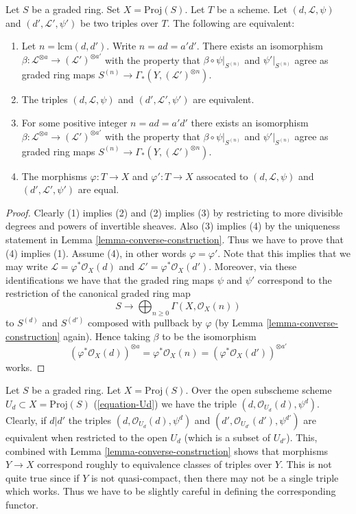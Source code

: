 \begin{lemma}
\label{lemma-equivalent}
Let $S$ be a graded ring. Set $X = \text{Proj}(S)$. Let $T$ be a scheme.
Let $(d, \mathcal{L}, \psi)$ and $(d', \mathcal{L}', \psi')$
be two triples over $T$. The following are equivalent:
\begin{enumerate}
\item Let $n = \text{lcm}(d, d')$. Write $n = ad = a'd'$. There exists
an isomorphism
$\beta : \mathcal{L}^{\otimes a} \to (\mathcal{L}')^{\otimes a'}$
with the property that
$\beta \circ \psi|_{S^{(n)}}$ and $\psi'|_{S^{(n)}}$ agree
as graded ring maps $S^{(n)} \to \Gamma_*(Y, (\mathcal{L}')^{\otimes n})$.
\item The triples $(d, \mathcal{L}, \psi)$ and $(d', \mathcal{L}', \psi')$
are equivalent.
\item For some positive integer $n = ad = a'd'$ there exists
an isomorphism
$\beta : \mathcal{L}^{\otimes a} \to (\mathcal{L}')^{\otimes a'}$
with the property that
$\beta \circ \psi|_{S^{(n)}}$ and $\psi'|_{S^{(n)}}$ agree
as graded ring maps $S^{(n)} \to \Gamma_*(Y, (\mathcal{L}')^{\otimes n})$.
\item The morphisms $\varphi : T \to X$ and $\varphi' : T \to X$
assocated to $(d, \mathcal{L}, \psi)$ and $(d', \mathcal{L}', \psi')$
are equal.
\end{enumerate}
\end{lemma}

\begin{proof}
Clearly (1) implies (2) and (2) implies (3) by restricting to
more divisible degrees and powers of invertible sheaves.
Also (3) implies (4) by the uniqueness statement
in Lemma \ref{lemma-converse-construction}.
Thus we have to prove that (4) implies (1). Assume (4),
in other words $\varphi = \varphi'$.
Note that this implies that we may write
$\mathcal{L} = \varphi^*\mathcal{O}_X(d)$ and
$\mathcal{L}' = \varphi^*\mathcal{O}_X(d')$.
Moreover, via these identifications we have that the graded ring
maps $\psi$ and $\psi'$ correspond to the restriction of the canonical
graded ring map
$$
S \longrightarrow \bigoplus\nolimits_{n \geq 0} \Gamma(X, \mathcal{O}_X(n))
$$
to $S^{(d)}$ and $S^{(d')}$ composed with pullback by $\varphi$
(by Lemma \ref{lemma-converse-construction} again). Hence taking
$\beta$ to be the isomorphism
$$
(\varphi^*\mathcal{O}_X(d))^{\otimes a} =
\varphi^*\mathcal{O}_X(n) =
(\varphi^*\mathcal{O}_X(d'))^{\otimes a'}
$$
works.
\end{proof}

\noindent
Let $S$ be a graded ring.
Let $X = \text{Proj}(S)$.
Over the open subscheme scheme $U_d \subset X = \text{Proj}(S)$
(\ref{equation-Ud}) we have the triple
$(d, \mathcal{O}_{U_d}(d), \psi^d)$. Clearly, if $d | d'$ the triples
$(d, \mathcal{O}_{U_d}(d), \psi^d)$ and
$(d', \mathcal{O}_{U_{d'}}(d'), \psi^{d'})$ are equivalent
when restricted to the open $U_d$ (which is a subset of $U_{d'}$).
This, combined with Lemma \ref{lemma-converse-construction} shows
that morphisms $Y \to X$ correspond roughly to
equivalence classes of triples over $Y$. This is not quite true since if $Y$ is
not quasi-compact, then there may not be a single triple which works.
Thus we have to be slightly careful in defining the corresponding functor.

